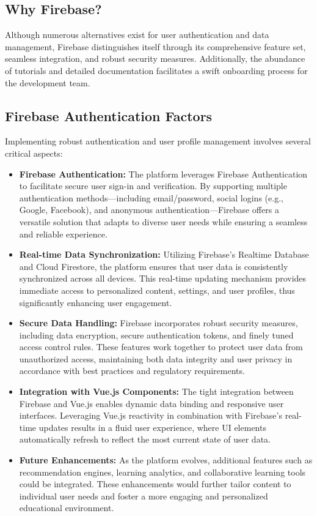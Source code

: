 \subsection{Why Firebase?}

Although numerous alternatives exist for user authentication and data management, Firebase distinguishes itself through its comprehensive feature set, 
seamless integration, and robust security measures. Additionally, the abundance of tutorials and detailed documentation facilitates a swift onboarding process for the development team.

\subsection{Firebase Authentication Factors}

Implementing robust authentication and user profile management involves several critical aspects:

\begin{itemize}
    \item \textbf{Firebase Authentication:} The platform leverages Firebase Authentication to facilitate secure user sign-in and verification. By supporting multiple authentication methods—including email/password, social logins (e.g., Google, Facebook), and anonymous authentication—Firebase offers a versatile solution that adapts to diverse user needs while ensuring a seamless and reliable experience.
    
    \item \textbf{Real-time Data Synchronization:} Utilizing Firebase’s Realtime Database and Cloud Firestore, the platform ensures that user data is consistently synchronized across all devices. This real-time updating mechanism provides immediate access to personalized content, settings, and user profiles, thus significantly enhancing user engagement.
    
    \item \textbf{Secure Data Handling:} Firebase incorporates robust security measures, including data encryption, secure authentication tokens, and finely tuned access control rules. These features work together to protect user data from unauthorized access, maintaining both data integrity and user privacy in accordance with best practices and regulatory requirements.
    
    \item \textbf{Integration with Vue.js Components:} The tight integration between Firebase and Vue.js enables dynamic data binding and responsive user interfaces. Leveraging Vue.js reactivity in combination with Firebase’s real-time updates results in a fluid user experience, where UI elements automatically refresh to reflect the most current state of user data.
    
    \item \textbf{Future Enhancements:} As the platform evolves, additional features such as recommendation engines, learning analytics, and collaborative learning tools could be integrated. These enhancements would further tailor content to individual user needs and foster a more engaging and personalized educational environment.
\end{itemize}

